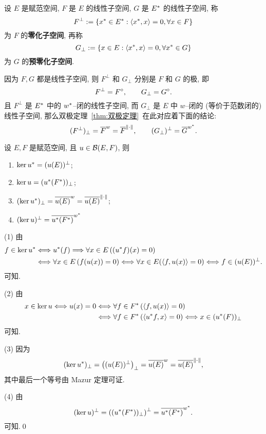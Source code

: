 	\begin{Definition}\label{def:零化子空间}
		设 $ E $ 是赋范空间, $ F $ 是 $ E $ 的线性子空间, $ G $ 是 $ E^{*} $ 的线性子空间, 称
		\[
			F^{\bot}:=\{ x^{*}\in E^{*}:\left\langle x^{*}, x \right\rangle=0, \forall x\in F \}
		\]	
		为 $ F $ 的\textbf{零化子空间}, 再称
		\[
			G_{\bot}:=\{ x\in E:\left\langle x^{*}, x \right\rangle=0, \forall x^{*}\in G \}
		\]
		为 $ G $ 的\textbf{预零化子空间}.
	\end{Definition}

	\begin{Remark}
		因为 $ F, G $ 都是线性子空间, 则 $ F^{\bot} $ 和 $ G_{\bot} $ 分别是 $ F $ 和 $ G $ 的极, 即
		\[
			F^{\bot}=F^{\circ},\qquad G_{\bot}=G^{\circ}.
		\]
		且 $ F^{\bot} $ 是 $ E^{*} $ 中的 $ w^{*} $--闭的线性子空间, 而 $ G_{\bot} $ 是 $ E $ 中 $ w $--闭的 (等价于范数闭的) 线性子空间, 那么双极定理~\ref{thm:双极定理}~在此对应着下面的结论:
		\[
			(F^{\bot})_{\bot}=\overline{F}^{w}=\overline{F}^{\left\| \cdot \right\|}, \qquad (G_{\bot})^{\bot}=\overline{G}^{w^{*}}.
		\]
	\end{Remark}

	\begin{Theorem}
		设 $ E, F $ 是赋范空间, 且 $ u\in\mathcal{B}(E, F) $, 则
		\begin{enumerate}[(1)]
			\item $ \ker u^{*}=(u(E))^{\bot} $;
			\item $ \ker u=(u^{*}(F^{*}))_{\bot} $;
			\item $ (\ker u^{*})_{\bot}=\overline{u(E)}^{w}=\overline{u(E)}^{\left\| \cdot \right\|} $;
			\item $ (\ker u)^{\bot}=\overline{u^{*}(F^{*})}^{w^{*}} $
		\end{enumerate}
	\end{Theorem}
	\begin{Proof}
		(1) 由
		\[
			\begin{aligned}
				f\in\ker u^{*} & \Longleftrightarrow u^{*}(f) \Longrightarrow \forall x\in E\,((u^{*}f)(x)=0)\\
				& \Longleftrightarrow \forall x\in E\,(f(u(x))=0) \Longleftrightarrow \forall x\in E(\left\langle f, u(x) \right\rangle=0)\Longleftrightarrow f\in(u(E))^{\bot}.
			\end{aligned}
		\]
		可知.

		(2) 由
		\[
			\begin{aligned}
				x\in\ker u\Longleftrightarrow u(x)=0 &  \Longleftrightarrow \forall f\in F^{*}\,(\left\langle f, u(x) \right\rangle=0)\\
				& \Longleftrightarrow \forall f\in F^{*}\,(\left\langle u^{*}f, x \right\rangle=0)\Longleftrightarrow x\in(u^{*}(F))_{\bot}
			\end{aligned}
		\]
		可知.

		(3) 因为
		\[
			(\ker u^{*})_{\bot}=\left( (u(E))^{\bot} \right)_{\bot}=\overline{u(E)}^{w}=\overline{u(E)}^{\left\| \cdot \right\|},
		\]
		其中最后一个等号由 Mazur 定理可证.

		(4) 由
		\[
			(\ker u)^{\bot}=\left( (u^{*}(F^{*}))_{\bot} \right)^{\bot}=\overline{u^{*}(F^{*})}^{w^{*}}.
		\]
		可知.\qed
	\end{Proof}

